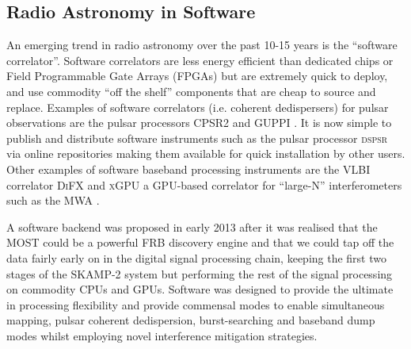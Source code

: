 \subsection{Radio Astronomy in Software}
An emerging trend in radio astronomy over the past 10-15 years is the ``software correlator''. Software correlators are less energy efficient than dedicated chips or Field Programmable Gate Arrays (FPGAs) but are extremely quick to deploy, and use commodity ``off the shelf'' components that are cheap to source and replace. Examples of software correlators (i.e. coherent dedispersers) for pulsar observations are the pulsar processors CPSR2 \citep{Bailes_2009} and GUPPI \citep{DuPlain_2008}. It is now simple to publish and distribute software instruments such as the pulsar processor \textsc{dspsr} \citep{van_Straten_2011} via online repositories making them available for quick installation by other users. Other examples of software baseband processing instruments are the VLBI correlator \textsc{DiFX} \citep{Deller_2007} 
 and \textsc{xGPU} \citep{Clark_2012} a GPU-based correlator for ``large-N'' interferometers such as the MWA \citep{Tingay_2013}. 

A software backend was proposed in early 2013 after it was realised that the MOST could be a powerful FRB discovery engine and that we could tap off the data fairly early on in the digital signal processing chain, keeping the first two stages of the SKAMP-2 system but performing the rest of the signal processing on commodity CPUs and GPUs. Software was designed to provide the ultimate in processing flexibility and provide commensal modes to enable simultaneous mapping, pulsar coherent dedispersion, burst-searching and baseband dump modes whilst employing novel interference mitigation strategies.
  
  